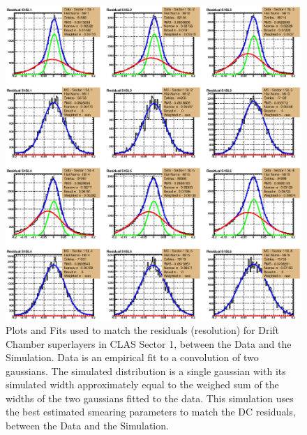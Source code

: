 \begin{figure}[htpb]\begin{center}
\includegraphics[width=0.8\columnwidth]{figures/calib/dc/Sector_1_compare.eps}
\caption[DC superlayers Resolution Matching]{\label{fig:SLRes}Plots and Fits used to match the residuals (resolution) for Drift Chamber superlayers in CLAS Sector 1, between the Data and the Simulation. Data is an empirical fit to a convolution of two gaussians. The simulated distribution is a single gaussian with its simulated width approximately equal to the weighed sum of the widths of the two gaussians fitted to the data. This simulation uses the best estimated smearing parameters to match the DC residuals, between the Data and the Simulation.}
\end{center}\end{figure}

